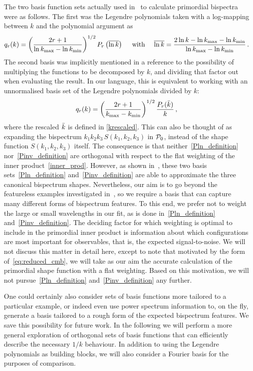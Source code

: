 The two basis function sets actually used in~\cite{Funakoshi} to calculate primordial bispectra were as follows.
The first was the Legendre polynomials taken with a log-mapping
between $k$ and the polynomial argument as 
\begin{align}\label{Pln_definition}
    q_{r}(k) = \left(\frac{2r+1} {\ln{k_\text{max}} - \ln{k_\text{min}}}\right)^{1/2} P_r\left(\overline {\ln k}\right)\quad~ \text{with}\quad~ \overline {\ln k}=\frac{2\ln k-\ln{k_\text{max}}-\ln{k_\text{min}}}{\ln{k_\text{max}}-\ln{k_\text{min}}}\,.
\end{align}  
The second basis was implicitly mentioned in a reference to the possibility of multiplying the functions
to be decomposed by $k$, and dividing that factor out when evaluating
the result.
In our language, this is equivalent to working with an unnormalised 
basis set of
the Legendre polynomials divided by $k$:
\begin{align}\label{Pinv_definition}
        q_{r}(k) = \left(\frac{2r+1} {{k_\text{max}} - {k_\text{min}}}\right)^{1/2} \frac{P_r(\bar{k})}{k}\,,
\end{align}
where the rescaled $\bar{k}$ is defined in \eqref{krescaled}.
This can also be thought of as expanding the bispectrum $k_1k_2k_3\,S(k_1,k_2,k_3)$ in $\mathcal{P}_0$,
instead of the shape function $S(k_1,k_2,k_3)$ itself. The consequence is that neither~\eqref{Pln_definition} nor~\eqref{Pinv_definition}
are orthogonal with respect to the flat weighting of the inner product~\eqref{inner_prod}.   However, as shown in~\cite{Funakoshi},
these two basis sets~\eqref{Pln_definition} and~\eqref{Pinv_definition}
are able to approximate the three canonical bispectrum shapes.   Nevertheless, our aim is to go beyond the featureless examples investigated in~\cite{Funakoshi},
so we require a basis that can capture many different forms of bispectrum features.
To this end, we prefer not to weight the large or small wavelengths in our fit,
as is done in~\eqref{Pln_definition} and~\eqref{Pinv_definition}.
The deciding factor for which weighting is optimal to include in the primordial inner product
is information about which configurations are most important for observables, that is, the expected signal-to-noise.
We will not discuss this matter in detail here, except to note that
motivated by the form of~\eqref{eq:reduced_cmb}, we will take as our aim the
accurate calculation of the primordial shape function with a flat weighting.
Based on this motivation, we will not pursue~\eqref{Pln_definition}
and~\eqref{Pinv_definition} any further.


One could certainly also consider sets of basis functions more tailored to a particular example,
or indeed even use power spectrum information to, on the fly,
generate a basis tailored to a rough form of the expected bispectrum features.
We save this possibility for future work.
In the following we will perform a more general exploration of orthogonal sets of basis functions that can
efficiently describe the necessary $1/k$ behaviour.
In addition to using the Legendre polynomials as building blocks,
we will also consider a Fourier basis for the purposes of comparison.


